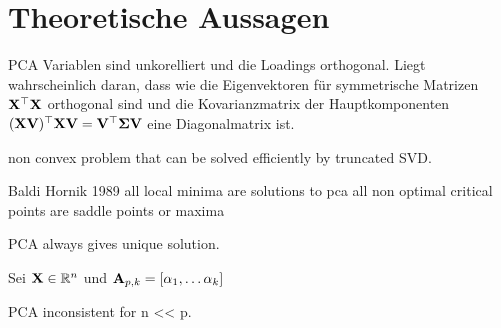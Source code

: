 \section{Theoretische Aussagen}
\label{pca_theorems}

PCA Variablen sind unkorelliert und die Loadings orthogonal. Liegt wahrscheinlich daran, dass wie die Eigenvektoren für symmetrische Matrizen $\mathbf{X}^{\top}\mathbf{X}$ orthogonal sind und die Kovarianzmatrix der Hauptkomponenten $(\mathbf{X} \mathbf{V})^{\top}\mathbf{X} \mathbf{V} = \mathbf{V}^{\top}\mathbf{\Sigma} \mathbf{V}$ eine Diagonalmatrix ist.

non convex problem that can be solved efficiently by truncated SVD.

Baldi Hornik 1989
all local minima are solutions to pca
all non optimal critical points are saddle points or maxima

\begin{thm}
PCA always gives unique solution.
\end{thm}

\begin{thm}
Sei $\mathbf{X} \in \mathbb{R}^n$ und $\mathbf{A}_{p,k} = [\alpha_1, \ldots \alpha_k] $   
\end{thm}

\begin{thm}
PCA inconsistent for n << p.
\end{thm}

